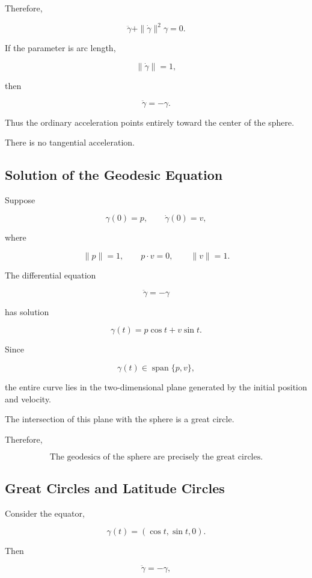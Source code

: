 \documentclass[12pt,a4paper]{article}
\theoremstyle{notespace}
\begin{document}
Therefore,

\[
\boxed{
	\ddot\gamma
	+
	\|\dot\gamma\|^2\gamma
	=
	0.
}
\]

If the parameter is arc length,

\[
\|\dot\gamma\|=1,
\]

then

\[
\boxed{
	\ddot\gamma
	=
	-
	\gamma.
}
\]

Thus the ordinary acceleration points entirely toward the center of the sphere.

There is no tangential acceleration.

\subsection{Solution of the Geodesic Equation}

Suppose

\[
\gamma(0)=p,
\qquad
\dot\gamma(0)=v,
\]

where

\[
\|p\|=1,
\qquad
p\cdot v=0,
\qquad
\|v\|=1.
\]

The differential equation

\[
\ddot\gamma=-\gamma
\]

has solution

\[
\boxed{
	\gamma(t)
	=
	p\cos t
	+
	v\sin t.
}
\]

Since

\[
\gamma(t)
\in
\operatorname{span}\{p,v\},
\]

the entire curve lies in the two-dimensional plane generated by the initial
position and velocity.

The intersection of this plane with the sphere is a great circle.

Therefore,

\[
\boxed{
	\text{The geodesics of the sphere are precisely the great circles.}
}
\]

\subsection{Great Circles and Latitude Circles}

Consider the equator,

\[
\gamma(t)
=
(\cos t,\sin t,0).
\]

Then

\[
\ddot\gamma
=
-
\gamma,
\]
\end{document}
